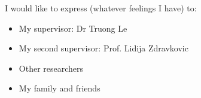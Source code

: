 \cleardoublepage


\begin{acknowledgements}

I would like to express (whatever feelings I have) to:

\begin{itemize}
 \item My supervisor: Dr Truong Le
 \vspace*{3mm}
 \item My second supervisor: Prof. Lidija Zdravkovic

 \vspace*{3mm}
 \item Other researchers
 \vspace*{3mm}
 \item My family and friends
\end{itemize}

\end{acknowledgements}